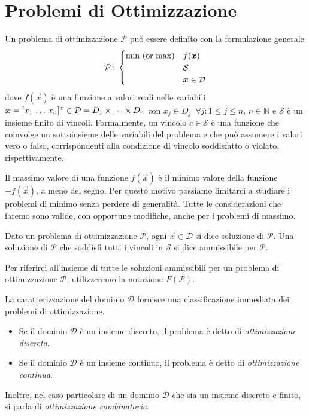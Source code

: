 \section{Problemi di Ottimizzazione}\label{sec:opt_probs}
Un problema di ottimizzazione $\mathcal{P}$ può essere definito con la
formulazione generale
\begin{equation}
    \mathcal{P}\colon
    \begin{cases}
        \text{$\min$ (or $\max$)} & f(\vec{x}) \\
                                  & \mathcal{S} \\
                                  & \vec{x} \in \mathcal{D}
    \end{cases}\\[10pt]
\end{equation}
dove $f(\vec{x})$ è una funzione a valori reali nelle variabili $\vec{x} =
[x_{1}\, \ldots \, x_{n}]^{\tr} \in \mathcal{D} = D_{1} \times
\cdots \times D_{n}$ con $x_{j} \in D_{j}\,\,\,\forall j\colon 1 \le j
\le n,\, n \in \mathbb{N}$ e $\mathcal{S}$ è un insieme finito di vincoli.
Formalmente, un vincolo $c \in \mathcal{S}$ è una funzione che coinvolge un
sottoinsieme delle variabili del problema e che può assumere i valori vero
o falso, corrispondenti alla condizione di vincolo soddisfatto o violato,
rispettivamente.

Il massimo valore di una funzione $f(\vec{x})$ è il minimo valore della
funzione $-f(\vec{x})$, a meno del segno. Per questo motivo possiamo
limitarci a studiare i problemi di minimo senza perdere di generalità.
Tutte le considerazioni che faremo sono valide, con opportune modifiche,
anche per i problemi di massimo.

\begin{definition}
Dato un problema di ottimizzazione $\mathcal{P}$, ogni $\vec{x} \in
\mathcal{D}$ si dice soluzione di $\mathcal{P}$. Una soluzione di
$\mathcal{P}$ che soddisfi tutti i vincoli in $\mathcal{S}$ si dice
ammissibile per $\mathcal{P}$.
\end{definition}
Per riferirci all'insieme di tutte le soluzioni ammissibili per un problema
di ottimizzazione $\mathcal{P}$, utilizzeremo la notazione
$F(\mathcal{P})$.

La caratterizzazione del dominio $\mathcal{D}$ fornisce una
classificazione immediata dei problemi di ottimizzazione.

\begin{itemize}
    \item Se il dominio $\mathcal{D}$ è un insieme discreto, il problema è
        detto di \textit{ottimizzazione discreta}.
    \item Se il dominio $\mathcal{D}$ è un insieme continuo, il problema è
        detto di \textit{ottimizzazione continua}.
\end{itemize}
Inoltre, nel caso particolare di un dominio $\mathcal{D}$ che sia un
insieme discreto e finito, si parla di \textit{ottimizzazione
combinatoria}.

